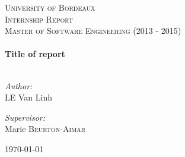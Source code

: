 \begin{titlepage}
\begin{center}
\textsc{\LARGE University of Bordeaux} \\[1.5cm]
\textsc{\Large Internship Report}\\[1cm]
\textsc{\Large Master of Software Engineering (2013 - 2015)}\\[0.5cm]
\HRule
\\[0.4cm]
\huge \bfseries Title of report
\\[0.4cm]
\HRule
\\[1cm]
\noindent 
\begin{minipage}[t]{0.6\textwidth}
\begin{flushleft}
\large\emph{Author:}\\
\textsc{LE} Van Linh
\end{flushleft}
\end{minipage}

\begin{minipage}[t]{0.6\textwidth}
\begin{flushright}
\large\emph{Supervisor:}\\
Marie \textsc{\LARGE Beurton-Aimar}
\end{flushright}
\end{minipage}

\vfill
{\large \today}
\end{center}
\end{titlepage}
